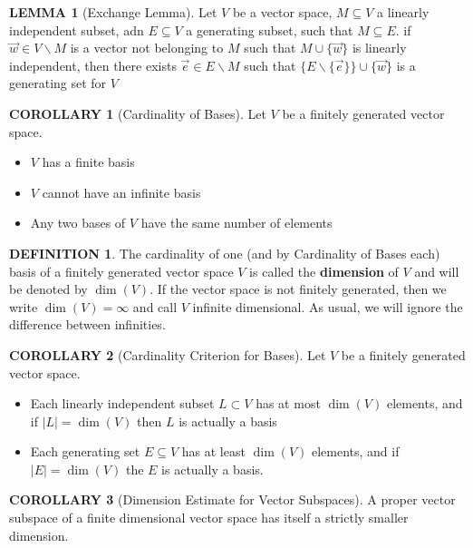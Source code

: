 \documentclass[10pt]{article}
\theoremstyle{definition}
\newtheorem{definition}{DEFINITION}[subsection]
\newtheorem{lemma}{LEMMA}[subsection]
\newtheorem{corollary}{COROLLARY}[subsection]
\begin{document}
\begin{lemma}[Exchange Lemma]
    Let $V$ be a vector space, $M \subseteq V$ a linearly independent subset, adn $E \subseteq V$ a generating subset, such that $M \subseteq E$. if $\overrightarrow{w} \in V\backslash M$ is a vector not belonging to $M$ such that $M \cup \{\overrightarrow{w}\}$ is linearly independent, then there exists $\overrightarrow{e} \in E\backslash M$ such that $\{E\backslash\{\overrightarrow{e}\}\}\cup \{\overrightarrow{w}\}$ is a generating set for $V$
\end{lemma}

\begin{corollary}[Cardinality of Bases]
    Let $V$ be a finitely generated vector space.
    \begin{itemize}
        \item $V$ has a finite basis
        \item $V$ cannot have an infinite basis
        \item Any two bases of $V$ have the same number of elements
    \end{itemize}
\end{corollary}

\begin{definition}
    The cardinality of one (and by Cardinality of Bases each) basis of a finitely generated vector space $V$ is called the \textbf{dimension} of $V$ and will be denoted by $\dim(V)$. If the vector space is not finitely generated, then we write $\dim(V) = \infty$ and call $V$ infinite dimensional. As usual, we will ignore the difference between infinities.
\end{definition}

\begin{corollary}[Cardinality Criterion for Bases]
    Let $V$ be a finitely generated vector space.
    \begin{itemize}
        \item Each linearly independent subset $L \subset V$ has at most $\dim(V)$ elements, and if $|L|=\dim(V)$ then $L$ is actually a basis
        \item Each generating set $E \subseteq V$ has at least $\dim(V)$ elements, and if $|E| = \dim(V)$ the $E$ is actually a basis.
    \end{itemize}
\end{corollary}

\begin{corollary}[Dimension Estimate for Vector Subspaces]
    A proper vector subspace of a finite dimensional vector space has itself a strictly smaller dimension.
\end{corollary}
\end{document}
